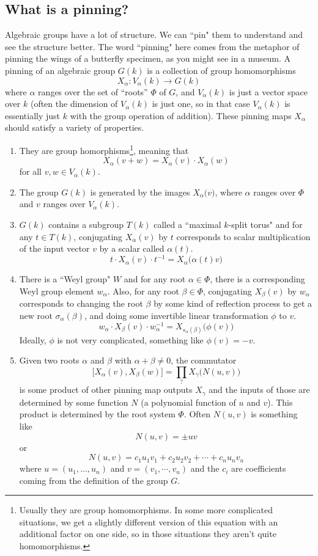\documentclass[12pt]{article}
\theoremstyle{definition}
\numberwithin{theorem}{subsection}
\newcommand{\sig}{\sigma}
\newcommand{\inv}{^{-1}}
\begin{document}
\subsection{What is a pinning?}

Algebraic groups have a lot of structure. We can ``pin" them to understand and see the structure better. The word ``pinning" here comes from the metaphor of pinning the wings of a butterfly specimen, as you might see in a museum. A pinning of an algebraic group $G(k)$ is a collection of group homomorphisms
\[
	X_\alpha:V_\alpha(k) \to G(k)
\]
where $\alpha$ ranges over the set of ``roots'' $\Phi$ of $G$, and $V_\alpha(k)$ is just a vector space over $k$ (often the dimension of $V_\alpha(k)$ is just one, so in that case $V_\alpha(k)$ is essentially just $k$ with the group operation of addition). These pinning maps $X_\alpha$ should satisfy a variety of properties.
\begin{enumerate}[(P1)]
	\item They are group homorphisms\footnote{Usually they are group homomorphisms. In some more complicated situations, we get a slightly different version of this equation with an additional factor on one side, so in those situations they aren't quite homomorphisms.}, meaning that
	\[
		X_\alpha(v+w) = X_\alpha(v) \cdot X_\alpha(w)
	\]
	for all $v,w \in V_\alpha(k)$.
	\item The group $G(k)$ is generated by the images $X_\alpha \big( v \big)$, where $\alpha$ ranges over $\Phi$ and $v$ ranges over $V_\alpha(k)$.
	\item $G(k)$ contains a subgroup $T(k)$ called a ``maximal $k$-split torus" and for any $t \in T(k)$, conjugating $X_\alpha(v)$ by $t$ corresponds to scalar multiplication of the input vector $v$ by a scalar called $\alpha(t)$.
	\[
		t \cdot X_\alpha(v) \cdot t \inv = X_\alpha \Big( \alpha(t) v \Big)
	\]
	\item There is a ``Weyl group" $W$ and for any root $\alpha \in \Phi$, there is a corresponding Weyl group element $w_\alpha$. Also, for any root $\beta \in \Phi$, conjugating $X_\beta(v)$ by $w_\alpha$ corresponds to changing the root $\beta$ by some kind of reflection process to get a new root $\sig_\alpha(\beta)$, and doing some invertible linear transformation $\phi$ to $v$.
	\[
		w_\alpha \cdot X_\beta(v) \cdot w_\alpha \inv = X_{s_\alpha(\beta)} \Big( \phi(v) \Big)
	\]
	Ideally, $\phi$ is not very complicated, something like $\phi(v) = -v$.
	\item Given two roots $\alpha$ and $\beta$ with $\alpha+\beta \neq 0$, the commutator
	\[
		\Big[ X_\alpha(v), X_\beta(w) \Big] = \prod_{?} X_\gamma\Big( N(u,v) \Big)
	\]
	is some product of other pinning map outputs $X_{\gamma}$ and the inputs of those are determined by some function $N$ (a polynomial function of $u$ and $v$). This product is determined by the root system $\Phi$. Often $N(u,v)$ is something like
\[
	N(u,v) = \pm uv
\]
or
\[
	N(u,v) = c_1 u_1 v_1 + c_2 u_2 v_2 + \cdots + c_n u_n v_n
\]
where $u = (u_1, \ldots, u_n)$ and $v = (v_1, \cdots, v_n)$ and the $c_i$ are coefficients coming from the definition of the group $G$.
\end{enumerate}
\end{document}
